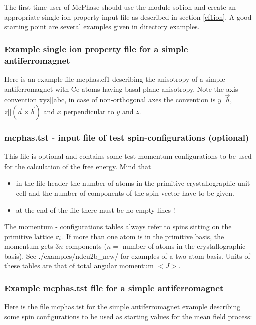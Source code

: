 The first time user of {\prg McPhase} should use the module {\prg so1ion} and 
create an appropriate single ion property input file as described in
section \ref{cf1ion}. A good starting point are several examples
given in directory {\prg examples}.


\subsubsection{Example single ion property file  for a simple antiferromagnet}

Here is an example file {\prg mcphas.cf1} describing the anisotropy of a 
simple antiferromagnet with Ce atoms having basal plane anisotropy. Note the
axis convention xyz$||$abc, in case of non-orthogonal axes the convention 
is $y||\vec b$, $z||(\vec a \times \vec b)$ and $x$ perpendicular to $y$ and $z$.




\subsubsection{{\prg mcphas.tst} - input file of test spin-configurations (optional)}
This file is optional and contains
some test momentum configurations to be used for the calculation
             of the free energy. Mind that
\begin{itemize}
\item  in the file header the number of atoms in the primitive
       crystallographic unit cell and the number of components
       of the spin vector have to be given.
\item  at the end of the
 file there must be no empty lines !
\end{itemize}

The momentum - configurations tables always refer to spins sitting on
the primitive lattice ${\mathbf r}_i$. If more than one atom is in
the primitive basis, the momentum gets $3n$ components ($n=$ number
of atoms in the crystallographic basis). See {\prg ./examples/ndcu2b\_new/} for
examples of a two atom basis. Units of these tables are that of total 
angular momentum $<J>$.

\subsubsection{Example {\prg mcphas.tst} file  for a simple antiferromagnet}

Here is the file {\prg mcphas.tst} for the simple antiferromagnet example
describing some spin configurations
to be used as starting values for the mean field process:

